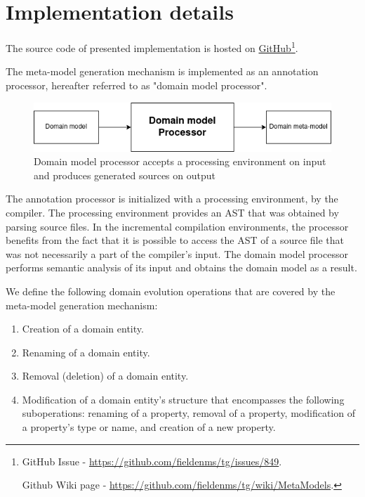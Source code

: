 \chapter{Implementation details}\label{chap:imp}

The source code of presented implementation is hosted on \href{https://github.com/fieldenms/tg/blob/Issue-\%23849/platform-annotation-processors/src/main/java/ua/com/fielden/platform/processors/metamodel/MetaModelProcessor.java}{GitHub}\footnote{GitHub Issue - \url{https://github.com/fieldenms/tg/issues/849}.

\; \;Github Wiki page - \url{https://github.com/fieldenms/tg/wiki/MetaModels}.}.

\n

The meta-model generation mechanism is implemented as an annotation processor, hereafter referred to as "domain model processor".

\begin{figure}[H]\centering
    \includegraphics[scale=0.65]{images/implement1.drawio.png}
    \caption[Input and output of the domain model processor]{Domain model processor accepts a processing environment on input and produces generated sources on output}\label{fig:implement1}
\end{figure}

The annotation processor is initialized with a processing environment, by the compiler.
The processing environment provides an AST that was obtained by parsing source files.
In the incremental compilation environments, the processor benefits from the fact that it is possible to access the AST of a source file that was not necessarily a part of the compiler’s input.
The domain model processor performs semantic analysis of its input and obtains the domain model as a result.

\n

We define the following domain evolution operations that are covered by the meta-model generation mechanism:
\begin{enumerate}
    \item Creation of a domain entity.
    \item Renaming of a domain entity.
    \item Removal (deletion) of a domain entity.
    \item Modification of a domain entity's structure that encompasses the following suboperations: renaming of a property, removal of a property, modification of a property's type or name, and creation of a new property.
\end{enumerate}

